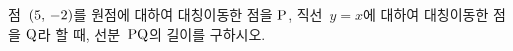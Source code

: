 점~$(5,\mkern3mu -2)$를 원점에 대하여 대칭이동한 점을 $\mathrm{P}$, 직선~$y=x$에 대하여 대칭이동한 점을 $\mathrm{Q}$라 할 때, 선분~$\mathrm{PQ}$의 길이를 구하시오.
